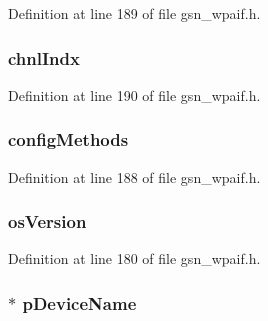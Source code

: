 Definition at line 189 of file gsn\_\-wpaif.h.

\hypertarget{a00427_a3ff94bef2c012a49993c3bdd94359710}{
\subsubsection[{chnlIndx}]{ {\bf chnlIndx}}}
\label{a00427_a3ff94bef2c012a49993c3bdd94359710}


Definition at line 190 of file gsn\_\-wpaif.h.

\hypertarget{a00427_a4f938b27a885def66901521b7fe7f539}{
\subsubsection[{configMethods}]{ {\bf configMethods}}}
\label{a00427_a4f938b27a885def66901521b7fe7f539}


Definition at line 188 of file gsn\_\-wpaif.h.

\hypertarget{a00427_aaf83aed06b536137725f61a663df99d0}{
\subsubsection[{osVersion}]{ {\bf osVersion}}}
\label{a00427_aaf83aed06b536137725f61a663df99d0}


Definition at line 180 of file gsn\_\-wpaif.h.

\hypertarget{a00427_a0690be2839815861009b4509a038fe1a}{
\subsubsection[{pDeviceName}]{$\ast$ {\bf pDeviceName}}}
\label{a00427_a0690be2839815861009b4509a038fe1a}


